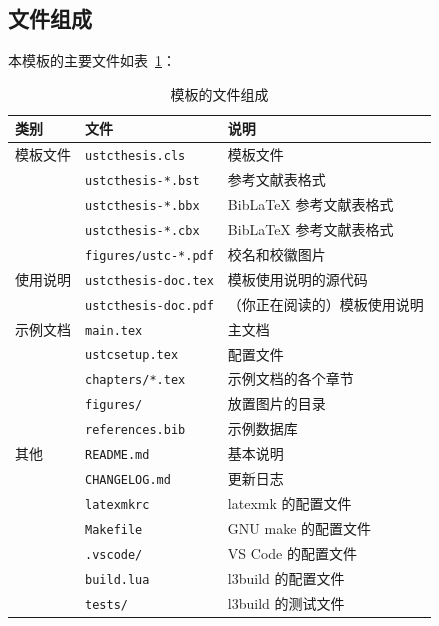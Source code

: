 \documentclass[a4paper]{ltxdoc}
\DeclareRobustCommand\file{\nolinkurl}
\begin{document}
\subsection{文件组成}
本模板的主要文件如表~\ref{tab:files}：
\begin{table}
  \centering\small
  \caption{模板的文件组成}
  \label{tab:files}
  \begin{tabular}{lll}
    \toprule
    类别     & 文件                      & 说明                         \\
    \midrule
    模板文件 & \file{ustcthesis.cls}     & 模板文件                     \\
             & \file{ustcthesis-*.bst}   & \BibTeX{} 参考文献表格式     \\
             & \file{ustcthesis-*.bbx}   & BibLaTeX 参考文献表格式      \\
             & \file{ustcthesis-*.cbx}   & BibLaTeX 参考文献表格式      \\
             & \file{figures/ustc-*.pdf} & 校名和校徽图片               \\
    \midrule
    使用说明 & \file{ustcthesis-doc.tex} & 模板使用说明的源代码         \\
             & \file{ustcthesis-doc.pdf} & （你正在阅读的）模板使用说明 \\
    \midrule
    示例文档 & \file{main.tex}           & 主文档                       \\
             & \file{ustcsetup.tex}      & 配置文件                     \\
             & \file{chapters/*.tex}     & 示例文档的各个章节           \\
             & \file{figures/}           & 放置图片的目录               \\
             & \file{references.bib}     & \BibTeX{} 示例数据库         \\
    \midrule
    其他     & \file{README.md}          & 基本说明                     \\
             & \file{CHANGELOG.md}       & 更新日志                     \\
             & \file{latexmkrc}          & latexmk 的配置文件           \\
             & \file{Makefile}           & GNU make 的配置文件          \\
             & \file{.vscode/}           & VS Code 的配置文件           \\
             & \file{build.lua}          & l3build 的配置文件           \\
             & \file{tests/}             & l3build 的测试文件           \\
    \bottomrule
  \end{tabular}
\end{table}
\end{document}
